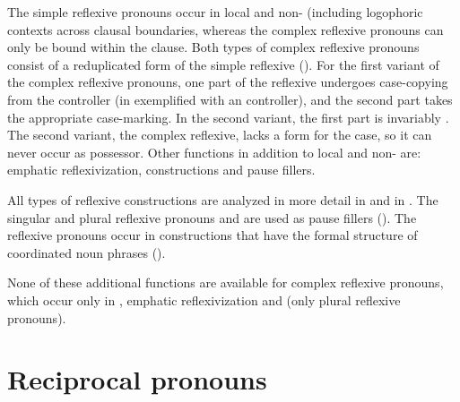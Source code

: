 The simple reflexive pronouns occur in local and non- (including logophoric contexts across clau\-sal boun\-daries, whereas the complex reflexive pronouns can only be bound within the clause. Both types of complex reflexive pronouns consist of a reduplicated form of the simple reflexive (). For the first variant of the complex reflexive pronouns, one part of the reflexive undergoes case-copying from the controller (in  exemplified with an  controller), and the second part takes the appropriate case-marking. In the second variant, the first part is invariably . The second variant, the complex  reflexive, lacks a form for the  case, so it can never occur as possessor. Other functions in addition to local and non- are: emphatic reflexivization,  constructions and pause fillers.

All types of reflexive constructions are analyzed in more detail in  and in \citet{Forker2014}. The  singular and plural reflexive pronouns  and  are used as pause fillers (). The  reflexive pronouns occur in  constructions that have the formal structure of coordinated noun phrases ().

None of these additional functions are available for complex reflexive pronouns, which occur only in , emphatic reflexivization and  (only plural reflexive pronouns).



\section{Reciprocal pronouns}
\label{sec:Reciprocal pronouns}

